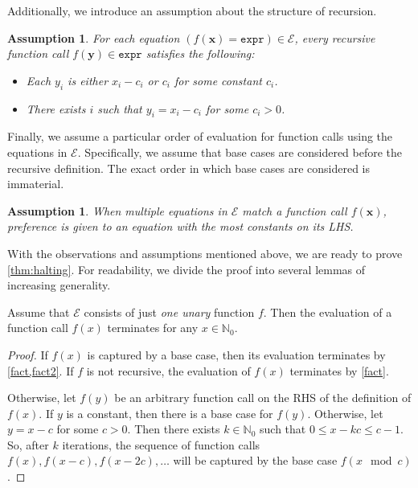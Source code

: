 \documentclass[a4paper,UKenglish,cleveref, autoref, thm-restate]{lipics-v2021}
\newcommand{\expr}{\mathtt{expr}}
\newtheorem{assumption}[theorem]{Assumption}
\begin{document}
Additionally, we introduce an assumption about the structure of recursion.

\begin{assumption}\label{assumption4}
  For each equation $(f(\mathbf{x}) = \expr) \in \mathcal{E}$, every recursive
  function call $f(\mathbf{y}) \in \expr$ satisfies the following:
  \begin{itemize}
    \item Each $y_{i}$ is either $x_{i} - c_{i}$ or $c_{i}$ for some constant
          $c_{i}$.
    \item There exists $i$ such that $y_{i} = x_{i} - c_{i}$ for some
          $c_{i} > 0$.
  \end{itemize}
\end{assumption}

Finally, we assume a particular order of evaluation for function calls using the
equations in $\mathcal{E}$. Specifically, we assume that base cases are
considered before the recursive definition. The exact order in which base cases
are considered is immaterial.

\begin{assumption}
  When multiple equations in $\mathcal{E}$ match a function call
  $f(\mathbf{x})$, preference is given to an equation with the most constants on
  its LHS.
\end{assumption}

With the observations and assumptions mentioned above, we are ready to prove
\cref{thm:halting}. For readability, we divide the proof into several lemmas of
increasing generality.

\begin{lemma}\label{lemma:oneunary}
  Assume that $\mathcal{E}$ consists of just \emph{one unary} function $f$. Then
  the evaluation of a function call $f(x)$ terminates for any
  $x \in \mathbb{N}_{0}$.
\end{lemma}
\begin{proof}
  If $f(x)$ is captured by a base case, then its evaluation terminates by
  \cref{fact,fact2}. If $f$ is not recursive, the evaluation of
  $f(x)$ terminates by \cref{fact}.

  Otherwise, let $f(y)$ be an arbitrary function call on the RHS of the
  definition of $f(x)$. If $y$ is a constant, then there is a base case for
  $f(y)$. Otherwise, let $y = x - c$ for some $c > 0$. Then there exists
  $k \in \mathbb{N}_{0}$ such that $0 \le x - kc \le c-1$. So, after $k$
  iterations, the sequence of function calls $f(x), f(x-c), f(x-2c),\dots$ will
  be captured by the base case $f(x \mod c)$.
\end{proof}
\end{document}
